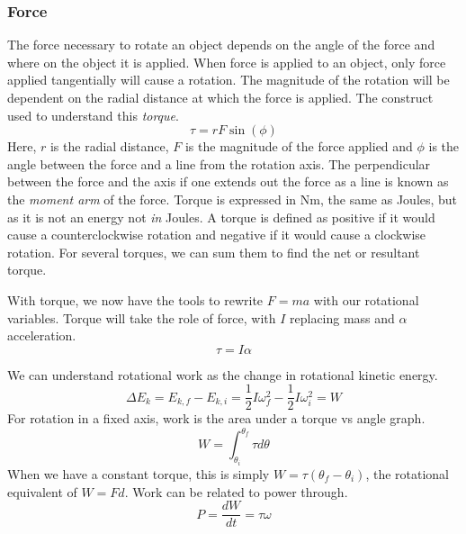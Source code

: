 \documentclass[12pt]{report}
\begin{document}
\begin{flushleft}
\subsubsection*{Force}
The force necessary to rotate an object depends on the angle of the force and
where on the object it is applied. When force is applied to an object, only 
force applied tangentially will cause a rotation. The magnitude of the rotation
will be dependent on the radial distance at which the force is applied. The
construct used to understand this \textit{torque}.
\[\tau = rF\sin(\phi)\]
Here, \(r\) is the radial distance, \(F\) is the magnitude of the force applied
and \(\phi\) is the angle between the force and a line from the rotation axis.
The perpendicular between the force and the axis if one extends out the force 
as a line is known as the \textit{moment arm} of the force. Torque is expressed
in \(\mathrm{Nm}\), the same as Joules, but as it is not an energy not 
\textit{in} Joules. A torque is defined as positive if it would cause a 
counterclockwise rotation and negative if it would cause a clockwise rotation.
For several torques, we can sum them to find the net or resultant torque.

\bigskip
With torque, we now have the tools to rewrite \(F = ma\) with our rotational
variables. Torque will take the role of force, with \(I\) replacing mass and
\(\alpha\) acceleration.
\[\tau = I\alpha\]

\bigskip
We can understand rotational work as the change in rotational kinetic energy.
\[\Delta E_k = E_{k, f} - E_{k, i} = 
\frac{1}{2}I\omega^2_f - \frac{1}{2}I\omega^2_i = W\]
For rotation in a fixed axis, work is the area under a torque vs angle graph.
\[W = \int^{\theta_f}_{\theta_i}\tau d\theta\]
When we have a constant torque, this is simply \(W = \tau(\theta_f - 
\theta_i)\), the rotational equivalent of \(W = Fd\). Work can be related to
power through.
\[P = \frac{dW}{dt} = \tau\omega\]


\end{flushleft}
\end{document}
